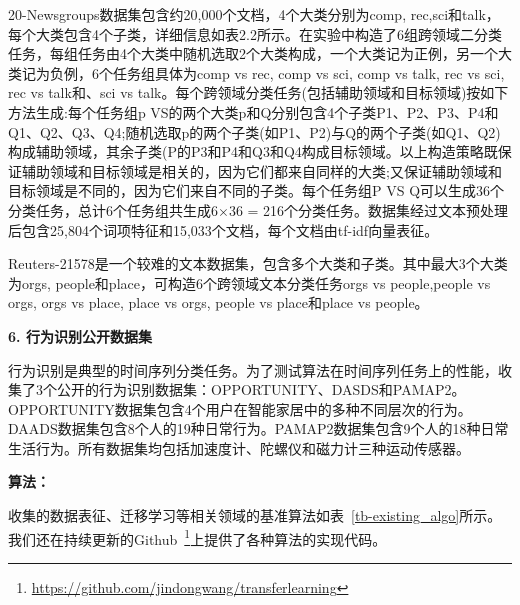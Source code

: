 20-Newsgroups数据集包含约20,000个文档，4个大类分别为comp, rec,sci和talk，每个大类包含4个子类，详细信息如表2.2所示。在实验中构造了6组跨领域二分类任务，每组任务由4个大类中随机选取2个大类构成，一个大类记为正例，另一个大类记为负例，6个任务组具体为comp vs rec, comp vs sci, comp vs talk,  rec vs sci,  rec vs talk和、sci vs talk。每个跨领域分类任务(包括辅助领域和目标领域)按如下方法生成:每个任务组p VS的两个大类p和Q分别包含4个子类P1、P2、P3、P4和Q1、Q2、Q3、Q4;随机选取p的两个子类(如P1、P2)与Q的两个子类(如Q1、Q2)构成辅助领域，其余子类(P的P3和P4和Q3和Q4构成目标领域。以上构造策略既保证辅助领域和目标领域是相关的，因为它们都来自同样的大类;又保证辅助领域和目标领域是不同的，因为它们来自不同的子类。每个任务组P VS Q可以生成36个分类任务，总计6个任务组共生成6$\times$36 = 216个分类任务。数据集经过文本预处理后包含25,804个词项特征和15,033个文档，每个文档由tf-idf向量表征。

Reuters-21578是一个较难的文本数据集，包含多个大类和子类。其中最大3个大类为orgs, people和place，可构造6个跨领域文本分类任务orgs vs people,people vs orgs, orgs vs place, place vs orgs, people vs place和place vs people。

\textbf{6. 行为识别公开数据集}

行为识别是典型的时间序列分类任务。为了测试算法在时间序列任务上的性能，收集了3个公开的行为识别数据集：OPPORTUNITY、DASDS和PAMAP2。OPPORTUNITY数据集包含4个用户在智能家居中的多种不同层次的行为。DAADS数据集包含8个人的19种日常行为。PAMAP2数据集包含9个人的18种日常生活行为。所有数据集均包括加速度计、陀螺仪和磁力计三种运动传感器。

\textbf{算法：}

收集的数据表征、迁移学习等相关领域的基准算法如表~\ref{tb-existing_algo}所示。我们还在持续更新的Github~\footnote{\url{https://github.com/jindongwang/transferlearning}}上提供了各种算法的实现代码。

